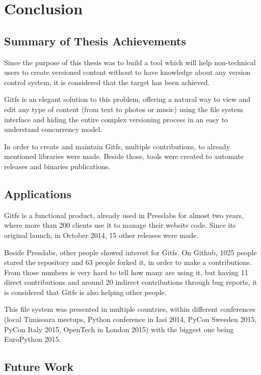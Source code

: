 
\chapter{Conclusion}

\label{ch:conclusions}

\section{Summary of Thesis Achievements}

Since the purpose of this thesis was to build a tool which will help non-technical users to create versioned content without to have knowledge about any version control system, it is considered that the target has been achieved.

Gitfs is an elegant solution to this problem, offering a natural way to view and edit any type of content (from text to photos or music) using the file system interface and hiding the entire complex versioning process in an easy to understand concurrency model.

In order to create and maintain Gitfs, multiple contributions, to already mentioned libraries were made. Beside those, tools were created to automate releases and binaries publications.

\section{Applications}

Gitfs is a functional product, already used in Presslabs for almost two years, where more than 200 clients use it to manage their website code. Since its original launch, in October 2014, 15 other releases were made.

Beside Presslabs, other people showed interest for Gitfs. On Github, 1025 people stared the repository and 63 people forked it, in order to make a contributions. From those numbers is very hard to tell how many are using it, but having 11 direct contributions and around 20 indirect contributions through bug reports, it is considered that Gitfs is also helping other people.

This file system was presented in multiple countries, within different conferences (local Timisoara meetups, Python conference in Iasi 2014, PyCon Sweeden 2015, PyCon Italy 2015, OpenTech in London 2015) with the biggest one being EuroPython 2015.

\section{Future Work}

